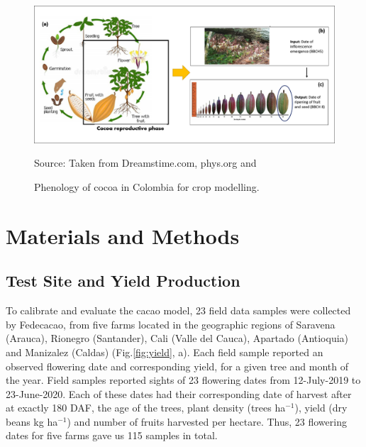 \documentclass[gene,journal,article,submit,moreauthors,pdftex]{Definitions/mdpi}
\begin{document}
\begin{figure}[h!]
	\centering
	\includegraphics[scale=0.15]{images/phenology.png}\\
	\caption{\footnotesize {Phenology of cocoa in Colombia for crop modelling.\\}} 
	\footnotesize{Source: Taken from Dreamstime.com, phys.org \citep{toledo2021} and \cite{lopez2018}}
	\label{fig:pheno}
\end{figure}

\section{Materials and Methods}



\subsection{Test Site and Yield Production }

To calibrate and evaluate the cacao model, 23 field data samples were collected by Fedecacao, from five farms located in the geographic regions of Saravena (Arauca), Rionegro (Santander), Cali (Valle del Cauca), Apartado (Antioquia) and Manizalez (Caldas) (Fig.\ref{fig:yield}, a). Each field sample reported an observed flowering date and corresponding yield, for a given tree and month of the year. Field samples reported sights of 23 flowering dates from 12-July-2019 to 23-June-2020. Each of these dates had their corresponding date of harvest after at exactly 180 DAF,  the age of the trees, plant density (trees ha$^{-1}$), yield  (dry beans kg ha$^{-1}$) and number of fruits harvested per hectare. Thus, 23 flowering dates for five farms gave us 115 samples in total.
\end{document}
